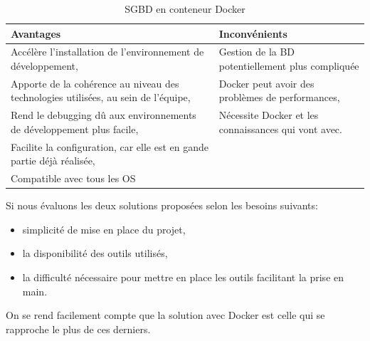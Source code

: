 \documentclass[
    iai, %
    il, %
]{heig-tb}
\begin{document}
\begin{table}[h]
    \begin{center}
        \caption{SGBD en conteneur Docker \label{dev-sgbd-docker}}
        \begin{tabularx}{1.0\textwidth} {X|X}
            Avantages                             & Inconvénients                                                         \\ \hline
            Accélère l'installation de l'environnement de développement,
            \cite{labrecque,data-flair-pros-cons} & Gestion de la BD
            potentiellement plus compliquée                                                                               \\
            Apporte de la cohérence au niveau des technologies utilisées, au sein de l'équipe,
            \cite{labrecque,data-flair-use-cases} & Docker peut avoir des problèmes de performances,
            \cite{labrecque}                                                                                              \\
            Rend le debugging dû aux environnements de développement plus facile,
            \cite{labrecque,koukia}               & Nécessite Docker et les connaissances qui vont avec. \cite{labrecque} \\
            Facilite la configuration, car elle est en gande partie déjà réalisée,
            \cite{data-flair-pros-cons}           &                                                                       \\
            Compatible avec tous les OS           &                                                                       \\
        \end{tabularx}
    \end{center}
\end{table}

Si nous évaluons les deux solutions proposées selon les besoins suivants:
\begin{itemize}
    \item simplicité de mise en place du projet,
    \item la disponibilité des outils utilisés,
    \item la difficulté nécessaire pour mettre en place les outils facilitant la prise en main.
\end{itemize}

On se rend facilement compte que la solution avec Docker est celle qui se rapproche le plus de ces derniers.
\end{document}
